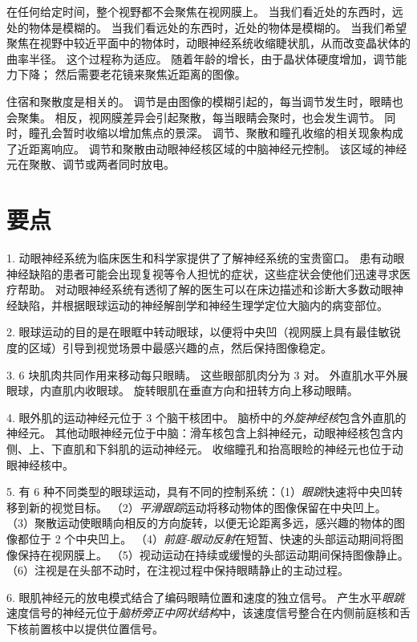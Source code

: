 在任何给定时间，整个视野都不会聚焦在视网膜上。
当我们看近处的东西时，远处的物体是模糊的。
当我们看远处的东西时，近处的物体是模糊的。
当我们希望聚焦在视野中较近平面中的物体时，动眼神经系统收缩睫状肌，从而改变晶状体的曲率半径。
这个过程称为适应。
随着年龄的增长，由于晶状体硬度增加，调节能力下降；
然后需要老花镜来聚焦近距离的图像。


住宿和聚散度是相关的。
调节是由图像的模糊引起的，每当调节发生时，眼睛也会聚集。
相反，视网膜差异会引起聚散，每当眼睛会聚时，也会发生调节。
同时，瞳孔会暂时收缩以增加焦点的景深。
调节、聚散和瞳孔收缩的相关现象构成了近距离响应。
调节和聚散由动眼神经核区域的中脑神经元控制。
该区域的神经元在聚散、调节或两者同时放电。



\section{要点}

1. 动眼神经系统为临床医生和科学家提供了了解神经系统的宝贵窗口。
患有动眼神经缺陷的患者可能会出现复视等令人担忧的症状，这些症状会使他们迅速寻求医疗帮助。
对动眼神经系统有透彻了解的医生可以在床边描述和诊断大多数动眼神经缺陷，并根据眼球运动的神经解剖学和神经生理学定位大脑内的病变部位。


2. 眼球运动的目的是在眼眶中转动眼球，以便将中央凹（视网膜上具有最佳敏锐度的区域）引导到视觉场景中最感兴趣的点，然后保持图像稳定。


3. 6 块肌肉共同作用来移动每只眼睛。
这些眼部肌肉分为 3 对。
外直肌水平外展眼球，内直肌内收眼球。
旋转眼肌在垂直方向和扭转方向上移动眼睛。


4. 眼外肌的运动神经元位于 3 个脑干核团中。
脑桥中的\textit{外旋神经核}包含外直肌的神经元。
其他动眼神经元位于中脑：滑车核包含上斜神经元，动眼神经核包含内侧、上、下直肌和下斜肌的运动神经元。
收缩瞳孔和抬高眼睑的神经元也位于动眼神经核中。


5. 有 6 种不同类型的眼球运动，具有不同的控制系统：（1）\textit{眼跳}快速将中央凹转移到新的视觉目标。
（2）\textit{平滑跟踪}运动将移动物体的图像保留在中央凹上。
（3）聚散运动使眼睛向相反的方向旋转，以便无论距离多远，感兴趣的物体的图像都位于 2 个中央凹上。
（4）\textit{前庭-眼动反射}在短暂、快速的头部运动期间将图像保持在视网膜上。
（5）视动运动在持续或缓慢的头部运动期间保持图像静止。
（6）注视是在头部不动时，在注视过程中保持眼睛静止的主动过程。


6. 眼肌神经元的放电模式结合了编码眼睛位置和速度的独立信号。
产生水平\textit{眼跳}速度信号的神经元位于\textit{脑桥旁正中网状结构}中，该速度信号整合在内侧前庭核和舌下核前置核中以提供位置信号。


